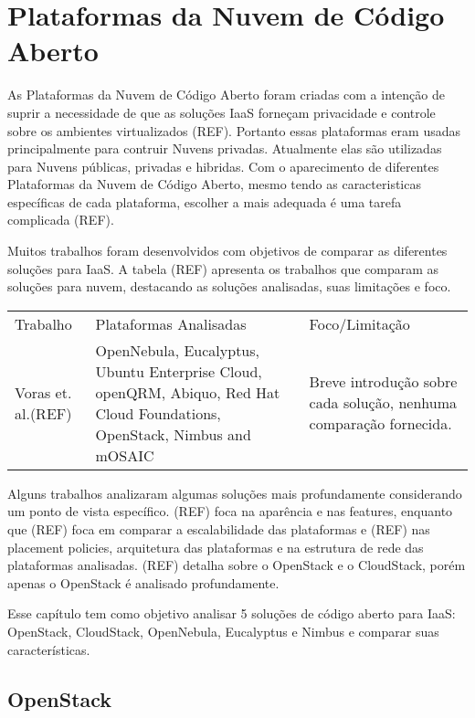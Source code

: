\chapter{Plataformas da Nuvem de Código Aberto}

As Plataformas da Nuvem de Código Aberto foram criadas com a intenção de suprir a necessidade de que as soluções IaaS forneçam privacidade e controle sobre os ambientes virtualizados (REF). Portanto essas plataformas eram usadas principalmente para contruir Nuvens privadas. Atualmente elas são utilizadas para Nuvens públicas, privadas e hibridas. Com o aparecimento de diferentes Plataformas da Nuvem de Código Aberto, mesmo tendo as caracteristicas específicas de cada plataforma, escolher a mais adequada é uma tarefa complicada (REF).

Muitos trabalhos foram desenvolvidos com objetivos de comparar as diferentes soluções para IaaS. A tabela (REF) apresenta os trabalhos que comparam as soluções para nuvem, destacando as soluções analisadas, suas limitações e foco.

\begin{tabular}{|l | p{5.5cm} | p{5.5cm}|}
	\hline
	Trabalho & Plataformas Analisadas & Foco/Limitação \\
	Voras et. al.(REF) & OpenNebula, Eucalyptus, Ubuntu Enterprise Cloud, openQRM, Abiquo, Red Hat Cloud Foundations, OpenStack, Nimbus and mOSAIC & Breve introdução sobre cada solução, nenhuma comparação fornecida.
	\tabularnewline

\end{tabular}

Alguns trabalhos analizaram algumas soluções mais profundamente considerando um ponto de vista específico. (REF) foca na aparência e nas features, enquanto que (REF) foca em comparar a escalabilidade das plataformas e (REF) nas placement policies, arquitetura das plataformas e na estrutura de rede das plataformas analisadas. (REF) detalha sobre o OpenStack e o CloudStack, porém apenas o OpenStack é analisado profundamente.

Esse capítulo tem como objetivo analisar 5 soluções de código aberto para IaaS: OpenStack, CloudStack, OpenNebula, Eucalyptus e Nimbus e comparar suas características.

\section{OpenStack}

